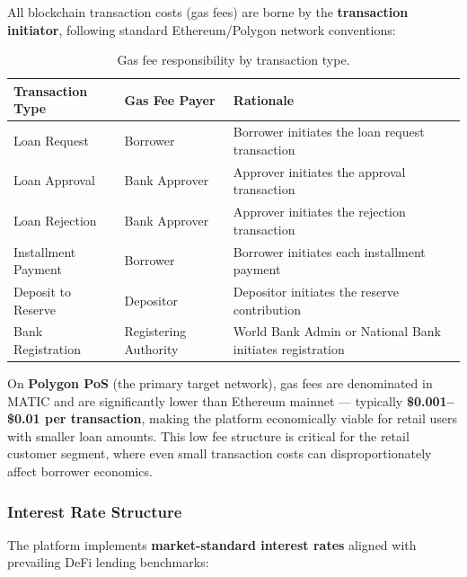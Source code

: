 \documentclass[11pt,a4paper]{article}
\newcommand{\tableheadfont}{\bfseries\small\color{PrimaryBlue}}
\newenvironment{moderntable}[1][H]{%
    \begin{table}[#1]\centering\small%
    \renewcommand{\arraystretch}{1.35}%
}{%
    \end{table}%
}
\begin{document}
All blockchain transaction costs (gas fees) are borne by the \textbf{transaction initiator}, following standard Ethereum/Polygon network conventions:

\begin{moderntable}
\caption{Gas fee responsibility by transaction type.}
\begin{tabular}{@{} >{\raggedright}p{3.8cm} >{\raggedright}p{3cm} >{\raggedright\arraybackslash}p{5cm} @{}}
\toprule
\tableheadfont Transaction Type & \tableheadfont Gas Fee Payer & \tableheadfont Rationale \\
\midrule
\rowcolor{RowShade}
Loan Request & Borrower & Borrower initiates the loan request transaction \\
Loan Approval & Bank Approver & Approver initiates the approval transaction \\
\rowcolor{RowShade}
Loan Rejection & Bank Approver & Approver initiates the rejection transaction \\
Installment Payment & Borrower & Borrower initiates each installment payment \\
\rowcolor{RowShade}
Deposit to Reserve & Depositor & Depositor initiates the reserve contribution \\
Bank Registration & Registering Authority & World Bank Admin or National Bank initiates registration \\
\bottomrule
\end{tabular}
\end{moderntable}

On \textbf{Polygon PoS} (the primary target network), gas fees are denominated in MATIC and are significantly lower than Ethereum mainnet --- typically \textbf{\$0.001--\$0.01 per transaction}, making the platform economically viable for retail users with smaller loan amounts. This low fee structure is critical for the retail customer segment, where even small transaction costs can disproportionately affect borrower economics.

\subsubsection{Interest Rate Structure}

The platform implements \textbf{market-standard interest rates} aligned with prevailing DeFi lending benchmarks:
\end{document}
